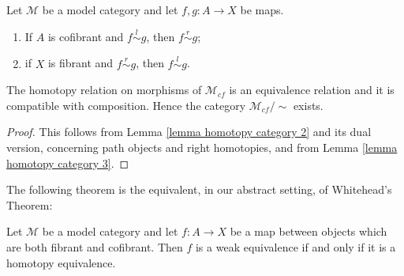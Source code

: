 \begin{refsection}

\begin{lemma} \label{lemma homotopy category 3}
Let $\mathcal M$ be a model category and let $f,g \colon A \to X$ be maps.
\begin{enumerate}
\item If $A$ is cofibrant and $f \stackrel{l}{\sim} g$, then $f \stackrel{r}{\sim} g$;
\item if $X$ is fibrant and $f \stackrel{r}{\sim} g$, then $f \stackrel{l}{\sim} g$.
\end{enumerate}
\end{lemma}


\begin{cor} \label{cor weak homotopy category}
The homotopy relation on morphisms of $\mathcal M_{cf}$ is an equivalence relation and it is compatible with composition. Hence the category $\mathcal M_{cf} / \sim$ exists.
\end{cor}

\begin{proof}
This follows from Lemma \ref{lemma homotopy category 2} and its dual version, concerning path objects and right homotopies, and from Lemma \ref{lemma homotopy category 3}.
\end{proof}

The following theorem is the equivalent, in our abstract setting, of Whitehead's Theorem:

\begin{thm} \label{thm abstract whitehead}
Let $\mathcal M$ be a model category and let $f \colon A \to X$ be a map between objects which are both fibrant and cofibrant. Then $f$ is a weak equivalence if and only if it is a homotopy equivalence.
\end{thm}


\end{refsection}

